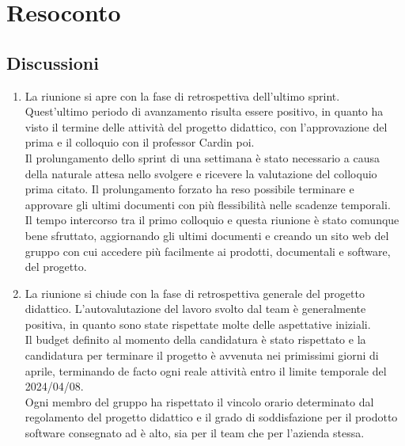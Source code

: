 \section{Resoconto} \label{sec:resoconto}
\subsection{Discussioni} \label{subsec:resdiscussione}
\begin{enumerate}
    \item La riunione si apre con la fase di retrospettiva dell'ultimo sprint. Quest'ultimo periodo di avanzamento risulta essere positivo, in quanto ha visto il termine delle attività del progetto didattico, con l'approvazione del  prima e il colloquio con il professor Cardin poi.\\
    Il prolungamento dello sprint di una settimana è stato necessario a causa della naturale attesa nello svolgere e ricevere la valutazione del colloquio prima citato. Il prolungamento forzato ha reso possibile terminare e approvare gli ultimi documenti con più flessibilità nelle scadenze temporali.\\
    Il tempo intercorso tra il primo colloquio e questa riunione è stato comunque bene sfruttato, aggiornando gli ultimi documenti e creando un sito web del gruppo con cui accedere più facilmente ai prodotti, documentali e software, del progetto.
    \item La riunione si chiude con la fase di retrospettiva generale del progetto didattico. L'autovalutazione del lavoro svolto dal team è generalmente positiva, in quanto sono state rispettate molte delle aspettative iniziali.\\
    Il budget definito al momento della candidatura è stato rispettato e la candidatura per terminare il progetto è avvenuta nei primissimi giorni di aprile, terminando de facto ogni reale attività entro il limite temporale del 2024/04/08.\\
    Ogni membro del gruppo ha rispettato il vincolo orario determinato dal regolamento del progetto didattico e il grado di soddisfazione per il prodotto software consegnato ad  è alto, sia per il team che per l'azienda stessa.
\end{enumerate}

